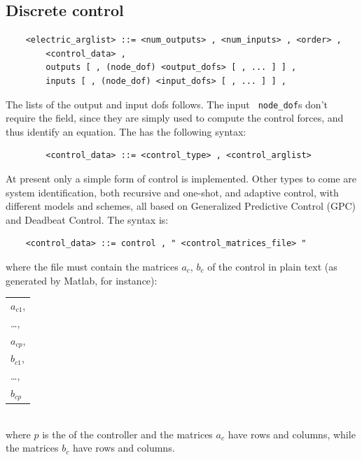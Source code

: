 \subsection{Discrete control}
  \begin{verbatim}
    <electric_arglist> ::= <num_outputs> , <num_inputs> , <order> ,
        <control_data> , 
        outputs [ , (node_dof) <output_dofs> [ , ... ] ] ,
        inputs [ , (node_dof) <input_dofs> [ , ... ] ] ,
  \end{verbatim}
  The lists of the output and input dofs follows. The input {\tt
  node\_dof}s don't require the  field, since they are simply
  used to compute the control forces, and thus identify an equation.
  The  has the following syntax:
  \begin{verbatim}  
        <control_data> ::= <control_type> , <control_arglist>
  \end{verbatim}
  At present only a simple form of control is implemented. Other types
  to come are system identification, both recursive and one-shot, and
  adaptive control, with different models and schemes, all based on 
  Generalized Predictive Control (GPC) and Deadbeat Control.
  The  syntax is:
  \begin{verbatim}
    <control_data> ::= control , " <control_matrices_file> "
  \end{verbatim}
  where the file  must contain the matrices
  $ a_c $, $ b_c $ of the control in plain text (as generated by Matlab, for
  instance): \\
  \begin{tabular}{l}
    $ a_{c1} $, \\
    \ldots,     \\
    $ a_{cp} $, \\
    $ b_{c1} $, \\
    \ldots,     \\
    $ b_{cp} $  \\
  \end{tabular} \\
  where $ p $ is the  of the controller and the matrices $ a_c $
  have  rows and  columns, while the
  matrices $ b_c $ have  rows and  columns.





